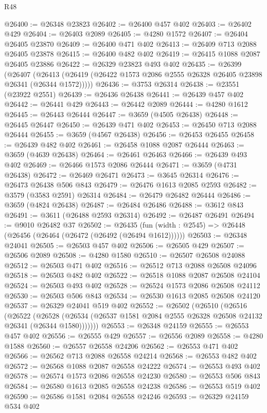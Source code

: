 \begin{lexlean}{R48}
\begin{coremodule}
@26400 := @26348 @23823
@26402 := @26400 @457 @402
@26403 := @26402 @429
@26404 := @26403 @2089
@26405 := @4280 @1572
@26407 := @26404 @26405 @23870
@26409 := @26400 @471 @402
@26413 := @26409 @713 @2088 @26405 @23878
@26415 := @26400 @482 @402
@26419 := @26415 @1088 @2087 @26405 @23886
@26422 := @26329 @23823 @493 @402
@26435 := @26399
    (@26407 (@26413 (@26419 (@26422 @1573 @2086 @2555 @26328 @26405 @23898 @26341 (@26344 @1572)))))
@26436 := @3753 @26314
@26438 := @23551 (@23922 @2551)
@26439 := @26436 @26438
@26441 := @26439 @457 @402
@26442 := @26441 @429
@26443 := @26442 @2089
@26444 := @4280 @1612
@26445 := @26443 @26444
@26447 := @3659 (@4505 @26438)
@26448 := @26445 @26447
@26450 := @26439 @471 @402
@26453 := @26450 @713 @2088 @26444
@26455 := @3659 (@4567 @26438)
@26456 := @26453 @26455
@26458 := @26439 @482 @402
@26461 := @26458 @1088 @2087 @26444
@26463 := @3659 (@4639 @26438)
@26464 := @26461 @26463
@26466 := @26439 @493 @402
@26469 := @26466 @1573 @2086 @26444
@26471 := @3659 (@4731 @26438)
@26472 := @26469 @26471
@26473 := @3645 @26314
@26476 := @26473 @26438 @506 @843
@26479 := @26476 @1613 @2085 @2593
@26482 := @3579 (@3583 @2591) @26314
@26484 := @26479 @26482 @26444
@26486 := @3659 (@4824 @26438)
@26487 := @26484 @26486
@26488 := @3612 @843
@26491 := @3611 (@26488 @2593 @26314)
@26492 := @26487 @26491
@26494 := @9010 @26482 @37
@26502 := @26435 (fun (width : @2545) => @26448 (@26456 (@26464 (@26472 (@26492 (@26494 @1612))))))
@26503 := @26348 @24041
@26505 := @26503 @457 @402
@26506 := @26505 @429
@26507 := @26506 @2089
@26508 := @4280 @1580
@26510 := @26507 @26508 @24088
@26512 := @26503 @471 @402
@26516 := @26512 @713 @2088 @26508 @24096
@26518 := @26503 @482 @402
@26522 := @26518 @1088 @2087 @26508 @24104
@26524 := @26503 @493 @402
@26528 := @26524 @1573 @2086 @26508 @24112
@26530 := @26503 @506 @843
@26534 := @26530 @1613 @2085 @26508 @24120
@26537 := @26329 @24041 @519 @402
@26552 := @26502
    (@26510
      (@26516
        (@26522
          (@26528 (@26534 (@26537 @1581 @2084 @2555 @26328 @26508 @24132 @26341 (@26344 @1580)))))))
@26553 := @26348 @24159
@26555 := @26553 @457 @402
@26556 := @26555 @429
@26557 := @26556 @2089
@26558 := @4280 @1588
@26560 := @26557 @26558 @24206
@26562 := @26553 @471 @402
@26566 := @26562 @713 @2088 @26558 @24214
@26568 := @26553 @482 @402
@26572 := @26568 @1088 @2087 @26558 @24222
@26574 := @26553 @493 @402
@26578 := @26574 @1573 @2086 @26558 @24230
@26580 := @26553 @506 @843
@26584 := @26580 @1613 @2085 @26558 @24238
@26586 := @26553 @519 @402
@26590 := @26586 @1581 @2084 @26558 @24246
@26593 := @26329 @24159 @534 @402

\end{coremodule}
\end{lexlean}
